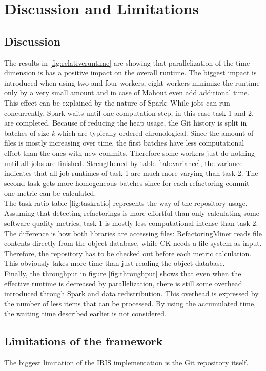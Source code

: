 
\section{Discussion and Limitations}
\label{sec:discussion}

\subsection{Discussion}
\label{sec:observations}
The results in \ref{fig:relativeruntime} are showing that parallelization of the time dimension is has a positive impact on the overall runtime. The biggest impact is introduced when using two and four workers, eight workers minimize the runtime only by a very small amount and in case of Mahout even add additional time. This effect can be explained by the nature of Spark: While jobs can run concurrently, Spark waits until one computation step, in this case task 1 and 2, are completed. Because of reducing the heap usage, the Git history is split in batches of size \emph{k} which are typically ordered chronological. Since the amount of files is mostly increasing over time, the first batches have less computational effort than the ones with new commits. Therefore some workers just do nothing until all jobs are finished. Strengthened by table \ref{tab:variance}, the variance indicates that all job runtimes of task 1 are much more varying than task 2. The second task gets more homogeneous batches since for each refactoring commit one metric can be calculated.\\
The task ratio table \ref{fig:taskratio} represents the way of the repository usage. Assuming that detecting refactorings is more effortful than only calculating some software quality metrics, task 1 is mostly less computational intense than task 2. The difference is how both libraries are accessing files: RefactoringMiner reads file contents directly from the object database, while CK needs a file system as input. Therefore, the repository has to be checked out before each metric calculation. This obviously takes more time than just reading the object database.\\
Finally, the throughput in figure \ref{fig:throughput} shows that even when the effective runtime is decreased by parallelization, there is still some overhead introduced through Spark and data redistribution. This overhead is expressed by the number of less items that can be processed. By using the accumulated time, the waiting time described earlier is not considered.

\subsection{Limitations of the framework}
The biggest limitation of the IRIS implementation is the Git repository itself. 

\label{sec:limitations}
